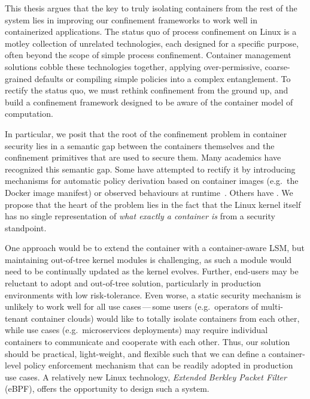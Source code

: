 This thesis argues that the key to truly isolating containers from the rest of the system
lies in improving our confinement frameworks to work well in containerized applications.
The status quo of process confinement on Linux is a motley collection of unrelated
technologies, each designed for a specific purpose, often beyond the scope of simple
process confinement. Container management solutions cobble these technologies together,
applying over-permissive, coarse-grained defaults or compiling simple policies into
a complex entanglement. To rectify the status quo, we must rethink confinement from the
ground up, and build a confinement framework designed to be aware of the container model
of computation.

In particular, we posit that the root of the confinement problem in container security
lies in a semantic gap between the containers themselves and the confinement primitives
that are used to secure them. Many academics have recognized this semantic gap. Some have
attempted to rectify it by introducing mechanisms for automatic policy derivation based on
container images (e.g.~the Docker image manifest) or observed behaviours at
runtime~. Others have . We propose that
the heart of the problem lies in the fact that the Linux kernel itself has no single
representation of \textit{what exactly a container is} from a security standpoint.

One approach would be to extend the container with a container-aware LSM, but maintaining
out-of-tree kernel modules is challenging, as such a module would need to be continually
updated as the kernel evolves. Further, end-users may be reluctant to adopt and
out-of-tree solution, particularly in production environments with low risk-tolerance.
Even worse, a static security mechanism is unlikely to work well for all use
cases\,---\,some users (e.g.~operators of multi-tenant container clouds) would like to
totally isolate containers from each other, while use cases (e.g.~microservices
deployments) may require individual containers to communicate and cooperate with each
other. Thus, our solution should be practical, light-weight, and flexible such that we can
define a container-level policy enforcement mechanism that can be readily adopted in
production use cases. A relatively new Linux technology, \textit{Extended Berkley Packet
Filter} (eBPF), offers the opportunity to design such a system.

